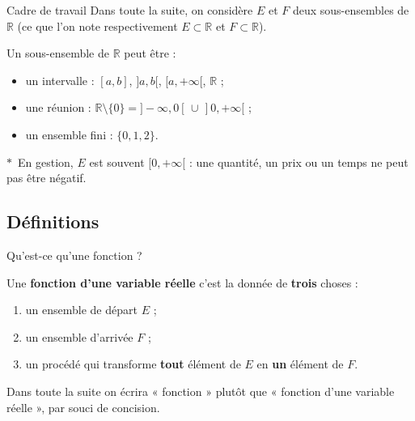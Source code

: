 \documentclass[aspectratio=169,11pt]{beamer}
\providecommand{\faLightbulb}{$\ast$}
\newcommand{\R}{\mathbb{R}}
\newcommand{\key}[1]{\textbf{\color{DarkBlue}#1}}
\newcommand{\important}[1]{\textbf{\color{DarkRed}#1}}
\begin{document}
\begin{frame}[shrink=8]{Cadre de travail}
	Dans toute la suite, on considère $E$ et $F$ deux sous-ensembles de $\R$
	(ce que l'on note respectivement $E\subset\R$ et $F\subset\R$).
	\vspace{0.35cm}
	\begin{definitionbox}[Rappel]
		Un sous-ensemble de $\R$ peut être :
		\begin{itemize}
			\item un intervalle : $[a,b]$, $]a,b[$, $[a,+\infty[$, $\R$ ;
			\item une réunion : $\R\setminus\{0\}=]-\infty,0[\,\cup\,]0,+\infty[$ ;
			\item un ensemble fini : $\{0,1,2\}$.
		\end{itemize}
	\end{definitionbox}
	\vspace{0.2cm}
	\begin{applicationbox}
		\faLightbulb\ En gestion, $E$ est souvent $[0,+\infty[$ : une quantité, un prix ou un temps
		ne peut pas être négatif.
	\end{applicationbox}
\end{frame}

\subsection{Définitions}

\begin{frame}{Qu'est-ce qu'une fonction ?}
	\begin{definitionbox}
		Une \key{fonction d'une variable réelle} c'est la donnée de \important{trois} choses :
		\begin{enumerate}
			\item un ensemble de départ $E$ ;
			\item un ensemble d'arrivée $F$ ;
			\item un procédé qui transforme \important{tout} élément de $E$ en \important{un} élément de $F$.
		\end{enumerate}
	\end{definitionbox}
	\vspace{0.25cm}
	\begin{attentionbox}
		Dans toute la suite on écrira « fonction » plutôt que « fonction d'une variable réelle »,
		par souci de concision.
	\end{attentionbox}
\end{frame}
\end{document}
